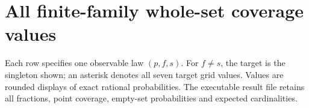 \documentclass[11pt,a4paper]{article}
\theoremstyle{definition}\newtheorem{definition}[theorem]{Definition}
\begin{document}
\section{All finite-family whole-set coverage values}\label{app:all}
Each row specifies one observable law $(p,f,s)$. For $f\ne s$, the target is the singleton shown; an asterisk denotes all seven target grid values. Values are rounded displays of exact rational probabilities. The executable result file retains all fractions, point coverage, empty-set probabilities and expected cardinalities.

\end{document}
